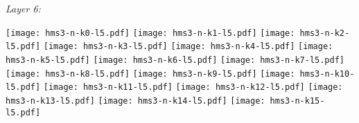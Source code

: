 \documentclass[11pt,a4paper]{article}
\begin{document}
\begin{flushleft}
\newpage
\emph{Layer 6:}

\texttt{[image: hms3-n-k0-l5.pdf]}
\texttt{[image: hms3-n-k1-l5.pdf]}
\texttt{[image: hms3-n-k2-l5.pdf]}
\texttt{[image: hms3-n-k3-l5.pdf]}
\texttt{[image: hms3-n-k4-l5.pdf]}
\texttt{[image: hms3-n-k5-l5.pdf]}
\texttt{[image: hms3-n-k6-l5.pdf]}
\texttt{[image: hms3-n-k7-l5.pdf]}
\texttt{[image: hms3-n-k8-l5.pdf]}
\texttt{[image: hms3-n-k9-l5.pdf]}
\texttt{[image: hms3-n-k10-l5.pdf]}
\texttt{[image: hms3-n-k11-l5.pdf]}
\texttt{[image: hms3-n-k12-l5.pdf]}
\texttt{[image: hms3-n-k13-l5.pdf]}
\texttt{[image: hms3-n-k14-l5.pdf]}
\texttt{[image: hms3-n-k15-l5.pdf]}

\end{flushleft}
\end{document}
